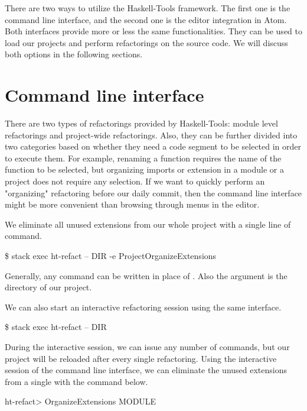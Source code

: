 \documentclass[main.tex]{subfiles}
\begin{document}
	
	There are two ways to utilize the Haskell-Tools framework. The first one is the command line interface, and the second one is the editor integration in Atom. Both interfaces provide more or less the same functionalities. They can be used to load our projects and perform refactorings on the source code. We will discuss both options in the following sections.
	
	\section{Command line interface}
	
	There are two types of refactorings provided by Haskell-Tools: module level refactorings and project-wide refactorings. Also, they can be further divided into two categories based on whether they need a code segment to be selected in order to execute them. For example, renaming a function requires the name of the function to be selected, but organizing imports or extension in a module or a project does not require any selection. If we want to quickly perform an "organizing" refactoring before our daily commit, then the command line interface might be more convenient than browsing through menus in the editor.
	
	We eliminate all unused extensions from our whole project with a single line of command.
	
	\begin{bash}
		\$ stack exec ht-refact -- DIR -e ProjectOrganizeExtensions
	\end{bash}
	
	Generally, any command can be written in place of . Also the  argument is the directory of our project.
	
	We can also start an interactive refactoring session using the same interface.
	
	\begin{bash}
		\$ stack exec ht-refact -- DIR
	\end{bash}
	
	During the interactive session, we can issue any number of commands, but our project will be reloaded after every single refactoring. Using the interactive session of the command line interface, we can eliminate the unused extensions from a single with the command below.
	
	\begin{bash}
		ht-refact> OrganizeExtensions MODULE
	\end{bash}
	
\end{document}
